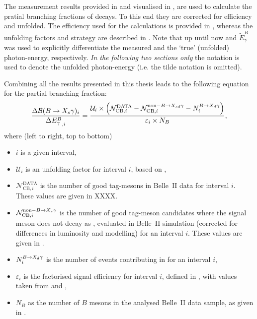 The measurement results provided in  and visualised in ,
are used to calculate the pratial branching fractions of \BtoXsgamma decays.
To this end they are corrected for efficiency and unfolded.
The efficiency used for the calculations is provided in , 
whereas the unfolding factors and strategy are described in .
Note that up until now \EB and $\tilde{E}_{\gamma}^B$ was used to explicitly differentiate
the measured and the `true' (unfolded) photon-energy, respectively.
\textit{In the following two sections only} the \EB notation is used to denote the unfolded photon-energy (i.e. the tilde notation is omitted).

Combining all the results presented in this thesis leads to the following equation for the partial branching fraction:
\begin{equation}\label{eq:branching_fraction}
    \frac{\Delta\mathcal{B}(\BtoXsgamma)_i}{\Delta {E^B_{\g}}_{,i}} = \frac{\mathcal{U}_i\times\left(\mathcal{N}^{\mathrm{DATA}}_{\mathrm{CB},i} - 
                                                                              \mathcal{N}^{\mathrm{non-}\BtoXsdgamma}_{\mathrm{CB},i} - 
                                                                              N_i^{\BtoXdgamma}\right)}
                                                         {\varepsilon_i \times N_B},
\end{equation}
where (left to right, top to bottom)
\begin{itemize}
    \item $i$ is a given \EB interval,
    \item $\mathcal{U}_i$ is an unfolding factor for interval $i$, based on ,
    \item $\mathcal{N}^{\mathrm{DATA}}_{\mathrm{CB},i}$ is the number of good tag-\B mesons in Belle~II data for interval $i$.
    These values are given in XXXX.
    \item $\mathcal{N}^{\mathrm{non-}\BtoXsgamma}_{\mathrm{CB},i}$ is the number of good tag-\B meson candidates where the signal \B meson does not decay as \BtoXsdgamma, evaluated in Belle~II simulation (corrected for differences in luminosity and modelling) for an interval $i$.
    These values are given in .
    \item $N_i^{\BtoXdgamma}$ is the number of \BtoXdgamma events contributing in for an interval $i$,
    \item $\varepsilon_i$ is the factorised signal efficiency for interval $i$, defined in , 
    with values taken from  and ,
    \item $N_B$ as the number of $B$ mesons in the analysed Belle~II data sample, as given in .
\end{itemize}

